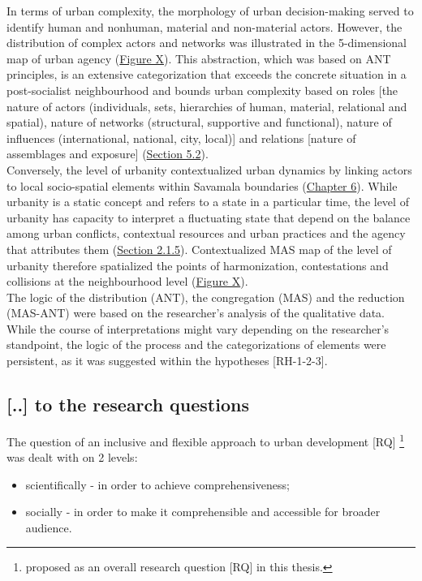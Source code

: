 \documentclass[11pt]{report}
\begin{document}
{In terms of urban complexity, the morphology of urban decision-making served to identify human and nonhuman, material and non-material actors. However, the distribution of complex actors and networks was illustrated in the 5-dimensional map of urban agency (\href{Figure ANT diagram}{Figure X}).
This abstraction, which was based on ANT principles, is an extensive categorization that exceeds the concrete situation in a post-socialist neighbourhood and bounds urban complexity based on roles [the nature of actors (individuals, sets, hierarchies of human, material, relational and spatial), nature of networks (structural, supportive and functional), nature of influences (international, national, city, local)] and relations [nature of assemblages and exposure] (\href{Section 5.2}{Section 5.2}).
\\

Conversely, the level of urbanity contextualized urban dynamics by linking actors to local socio-spatial elements within Savamala boundaries  (\href{Chapter 6}{Chapter 6}). 
While urbanity is a static concept and refers to a state in a particular time, the level of urbanity has capacity to interpret a fluctuating state that depend on the balance among urban conflicts, contextual resources and urban practices and the agency that attributes them (\href{Section 2.1.5}{Section 2.1.5}).
Contextualized MAS map of the level of urbanity therefore spatialized the points of harmonization, contestations and collisions at the neighbourhood level (\href{Figure MAS diagram}{Figure X}).
\\

The logic of the distribution (ANT), the congregation (MAS) and the reduction (MAS-ANT) were based on the researcher's analysis of the qualitative data. While the course of interpretations might vary depending on the researcher's standpoint, the logic of the process and the categorizations of elements were persistent, as it was suggested within the hypotheses [RH-1-2-3].

\subsection{[..] to the research questions}

The question of an inclusive and flexible approach to urban development [RQ]
\footnote{proposed as an overall research question [RQ] in this thesis.}
was dealt with on 2 levels:

\begin{itemize}
\item scientifically - in order to achieve comprehensiveness;
\item socially - in order to make it comprehensible and accessible for broader audience.
\end{itemize}

}
\end{document}
